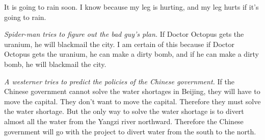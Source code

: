 \begin{exercises}
\item It is going to rain soon. I know because my leg is hurting, and my leg hurts if it’s going to rain.



\item  \emph{Spider-man tries to figure out the bad guy’s plan.} If Doctor Octopus gets the uranium, he will blackmail the city. I am certain of this because if Doctor Octopus gets the uranium, he can make a dirty bomb, and if he can make a dirty bomb, he will blackmail the city.



\item \emph{A westerner tries to predict the policies of the Chinese government.} If the Chinese government cannot solve the water shortages in Beijing, they will have to move the capital. They don’t want to move the capital. Therefore they must solve the water shortage. But the only way to solve the water shortage is to divert almost all the water from the Yangzi river northward. Therefore the Chinese government will go with the project to divert water from the south to the north.





\end{exercises}




